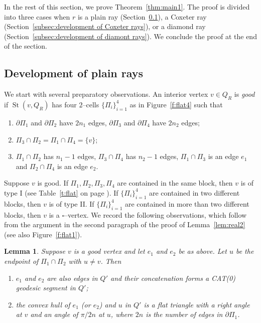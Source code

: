 \documentclass[11pt]{amsart}
\newcommand{\St}{\operatorname{St}}
\newtheorem{lemma}[theorem]{Lemma}
\theoremstyle{definition}
\begin{document}
In the rest of this section, we prove Theorem~\ref{thm:main1}. The proof is divided into three cases when $r$ is a plain ray (Section~\ref{subsec:development of plain rays}), a Coxeter ray (Section~\ref{subsec:development of Coxeter rays}), or a diamond ray (Section~\ref{subsec:development of diamont rays}). We conclude the proof at the end of the section.

\subsection{Development of plain rays}
\label{subsec:development of plain rays}
We start with several preparatory observations. An interior vertex $v\in Q_R$ is \emph{good} if $\St(v,Q_R)$ has four $2$--cells $\{\Pi_i\}_{i=1}^4$ as in Figure~\ref{f:flat4} such that
\begin{enumerate}
	\item $\partial\Pi_1$ and $\partial\Pi_2$ have $2n_1$ edges, $\partial\Pi_3$ and $\partial\Pi_4$ have $2n_2$ edges;
	\item $\Pi_3\cap\Pi_2=\Pi_1\cap\Pi_4=\{v\}$;
	\item $\Pi_1\cap\Pi_2$ has $n_1-1$ edges, $\Pi_3\cap\Pi_4$ has $n_2-1$ edges, $\Pi_1\cap\Pi_3$ is an edge $e_1$ and $\Pi_2\cap\Pi_4$ is an edge $e_2$.
\end{enumerate}
Suppose $v$ is good. If $\Pi_1,\Pi_2,\Pi_3,\Pi_4$ are contained in the same block, then $v$ is of type I (see Table~\ref{t:flat} on page \pageref{t:flat}). If $\{\Pi_i\}_{i=1}^4$ are contained in two different blocks, then $v$ is of type II. If $\{\Pi_i\}_{i=1}^4$ are contained in more than two different blocks, then $v$ is a $\square$--vertex. We record the following observations, which follow from the argument in the second paragraph of the proof of Lemma~\ref{lem:real2} (see also Figure~\ref{f:flat1}).

\begin{lemma}
	\label{lem:concat}
	Suppose $v$ is a good vertex and let $e_1$ and $e_2$ be as above. Let $u$ be the endpoint of $\Pi_1\cap\Pi_2$ with $u\neq v$. Then 
	\begin{enumerate}
		\item $e_1$ and $e_2$ are also edges in $Q'$ and their concatenation forms a CAT(0) geodesic segment in $Q'$;
		\item the convex hull of $e_1$ (or $e_2$) and $u$ in $Q'$ is a flat triangle with a right angle at $v$ and an angle of $\pi/2n$ at $u$, where $2n$ is the number of edges in $\partial\Pi_1$.
	\end{enumerate}
\end{lemma}
\end{document}
